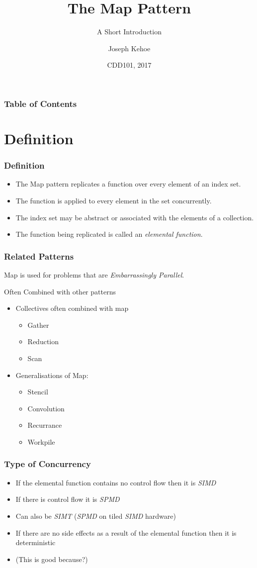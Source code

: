\documentclass{beamer}
\title[The Map Pattern] %
{The Map Pattern}
\subtitle{A Short Introduction}
\author[Dr. Joseph Kehoe] %
{Joseph Kehoe\inst{1}}
\institute[IT Carlow] %
{
	\inst{1}%
	Department of Computing and Networking\\
	Institute of Technology Carlow
}
\date[ITC 2017] %
{CDD101, 2017}
\begin{document}
 
\frame{\titlepage}
 
 
 
 \begin{frame}
 	\frametitle{Table of Contents}
 	\tableofcontents
 \end{frame}
 
 
 \section{Definition}
\begin{frame}
\frametitle{Definition}

\begin{itemize}
	\item The Map pattern replicates a function over every element of an index set.
	\item The function is applied to every element in the set concurrently.
	\item The index set may be abstract or associated with the elements of a collection.
	\item The function being replicated is called  an \emph{elemental function}.
\end{itemize}
\end{frame}

\begin{frame}
	\frametitle{Related Patterns}
Map is used for problems that are \emph{Embarrassingly Parallel}.

Often Combined with other patterns

\begin{itemize}
	\item Collectives often combined with map
	\begin{itemize}
		\item Gather
		\item Reduction
		\item Scan
	\end{itemize}
	\item Generalisations of Map:
	\begin{itemize}
		\item Stencil
		\item Convolution
		\item Recurrance
		\item Workpile
	\end{itemize}
\end{itemize}
\end{frame}

\begin{frame}
	\frametitle{Type of Concurrency}
\begin{itemize}
	\item If the elemental function contains no control flow then it is \emph{SIMD}
	\item If there is control flow it is  \emph{SPMD}
	\item Can also be \emph{SIMT} (\emph{SPMD} on tiled \emph{SIMD} hardware)
	\item If there are no side effects as a result of the elemental function then it is deterministic
	\item (This is good because?)
\end{itemize}
\end{frame}
\end{document}
